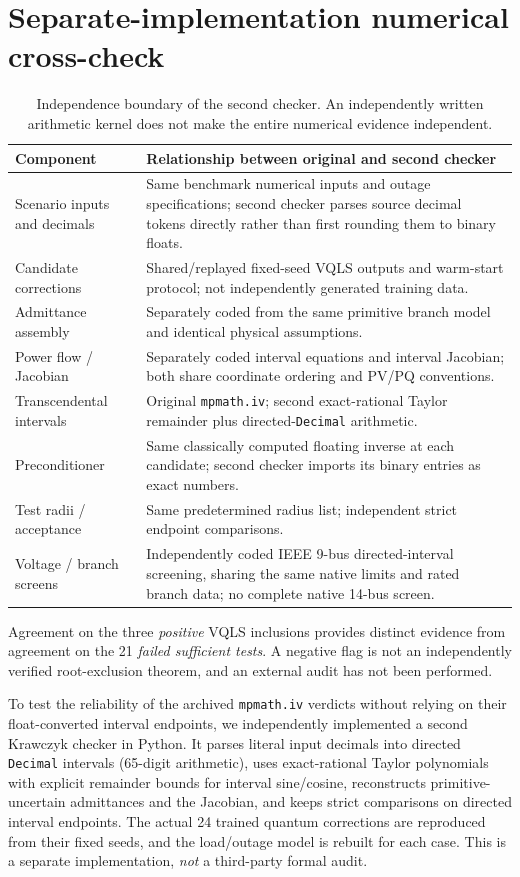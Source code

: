 \documentclass[11pt,a4paper]{article}
\theoremstyle{remark}\newtheorem{remark}[theorem]{Remark}
\begin{document}
\section{Separate-implementation numerical cross-check}\label{sec:secondverification}
\begin{table}[htbp]\centering\scriptsize
\caption{Independence boundary of the second checker. An independently written arithmetic kernel does not make the entire numerical evidence independent.}
\begin{tabularx}{\linewidth}{@{}p{34mm}X@{}}\toprule
Component & Relationship between original and second checker \\\midrule
Scenario inputs and decimals & Same benchmark numerical inputs and outage specifications; second checker parses source decimal tokens directly rather than first rounding them to binary floats. \\
Candidate corrections & Shared/replayed fixed-seed VQLS outputs and warm-start protocol; not independently generated training data. \\
Admittance assembly & Separately coded from the same primitive branch model and identical physical assumptions. \\
Power flow / Jacobian & Separately coded interval equations and interval Jacobian; both share coordinate ordering and PV/PQ conventions. \\
Transcendental intervals & Original \texttt{mpmath.iv}; second exact-rational Taylor remainder plus directed-\texttt{Decimal} arithmetic. \\
Preconditioner & Same classically computed floating inverse at each candidate; second checker imports its binary entries as exact numbers. \\
Test radii / acceptance & Same predetermined radius list; independent strict endpoint comparisons. \\
Voltage / branch screens & Independently coded IEEE 9-bus directed-interval screening, sharing the same native limits and rated branch data; no complete native 14-bus screen. \\\bottomrule
\end{tabularx}\label{tab:independence}
\end{table}
Agreement on the three \emph{positive} VQLS inclusions provides distinct evidence from agreement on the 21 \emph{failed sufficient tests}. A negative flag is not an independently verified root-exclusion theorem, and an external audit has not been performed.

To test the reliability of the archived \texttt{mpmath.iv} verdicts without relying on their float-converted interval endpoints, we independently implemented a second Krawczyk checker in Python. It parses literal input decimals into directed \texttt{Decimal} intervals (65-digit arithmetic), uses exact-rational Taylor polynomials with explicit remainder bounds for interval sine/cosine, reconstructs primitive-uncertain admittances and the Jacobian, and keeps strict comparisons on directed interval endpoints. The actual 24 trained quantum corrections are reproduced from their fixed seeds, and the load/outage model is rebuilt for each case. This is a separate implementation, \emph{not} a third-party formal audit.
\end{document}
